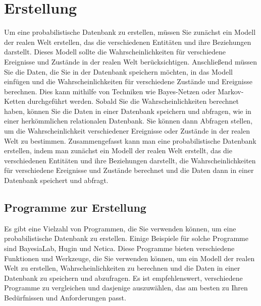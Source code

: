 \chapter{Erstellung}

Um eine probabilistische Datenbank zu erstellen, müssen Sie zunächst ein Modell der realen Welt erstellen, das die verschiedenen Entitäten und ihre Beziehungen darstellt. Dieses Modell sollte die Wahrscheinlichkeiten für verschiedene Ereignisse und Zustände in der realen Welt berücksichtigen.
\vspace{1cm}
Anschließend müssen Sie die Daten, die Sie in der Datenbank speichern möchten, in das Modell einfügen und die Wahrscheinlichkeiten für verschiedene Zustände und Ereignisse berechnen. Dies kann mithilfe von Techniken wie Bayes-Netzen oder Markov-Ketten durchgeführt werden.
\vspace{1cm}
Sobald Sie die Wahrscheinlichkeiten berechnet haben, können Sie die Daten in einer Datenbank speichern und abfragen, wie in einer herkömmlichen relationalen Datenbank. Sie können dann Abfragen stellen, um die Wahrscheinlichkeit verschiedener Ereignisse oder Zustände in der realen Welt zu bestimmen.
\vspace{1cm}
Zusammengefasst kann man eine probabilistische Datenbank erstellen, indem man zunächst ein Modell der realen Welt erstellt, das die verschiedenen Entitäten und ihre Beziehungen darstellt, die Wahrscheinlichkeiten für verschiedene Ereignisse und Zustände berechnet und die Daten dann in einer Datenbank speichert und abfragt.


\section{Programme zur Erstellung}
Es gibt eine Vielzahl von Programmen, die Sie verwenden können, um eine probabilistische Datenbank zu erstellen. Einige Beispiele für solche Programme sind BayesiaLab, Hugin und Netica. Diese Programme bieten verschiedene Funktionen und Werkzeuge, die Sie verwenden können, um ein Modell der realen Welt zu erstellen, Wahrscheinlichkeiten zu berechnen und die Daten in einer Datenbank zu speichern und abzufragen. Es ist empfehlenswert, verschiedene Programme zu vergleichen und dasjenige auszuwählen, das am besten zu Ihren Bedürfnissen und Anforderungen passt.




